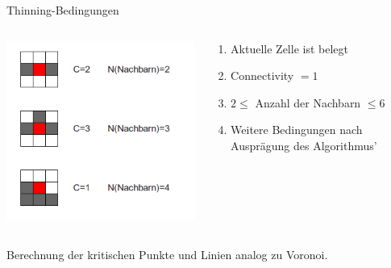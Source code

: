 \begin{frame}{Thinning-Bedingungen}

\begin{columns}\begin{column}[l]{0.4\textwidth}

\includegraphics[width=1.0\textwidth]{./material/thinning2.png}

\end{column}
\begin{column}[r]{0.6\textwidth}
 \pause
 \begin{enumerate}
  \item Aktuelle Zelle ist belegt
  \item Connectivity $ = 1$
  \item $2 \leq $ Anzahl der Nachbarn $ \leq 6$
  \item Weitere Bedingungen nach Ausprägung des Algorithmus'
 \end{enumerate}
 
\end{column}
\end{columns}
 
\end{frame}
\begin{frame}
 Berechnung der kritischen Punkte und Linien analog zu Voronoi.

\end{frame}

